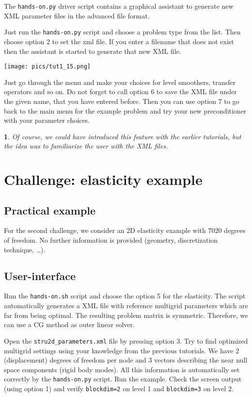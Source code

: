 \documentclass[10pt,fleqn]{book}
\newtheorem*{mycomment}{\ding{42}}
\begin{document}
The \verb|hands-on.py| driver script contains a graphical assistant to generate new XML parameter files in the advanced \muelu file format.

Just run the \verb|hands-on.py| script and choose a problem type from the list. Then choose option 2 to set the xml file. If you enter a filename that does not exist then the assistant is started to generate that new XML file.

\begin{center}\texttt{[image: pics/tut1\_15.png]} \end{center}

Just go through the menu and make your choices for level smoothers, transfer operators and so on. Do not forget to call option 6 to save the XML file under the given name, that you have entered before. Then you can use option 7 to go back to the main menu for the example problem and try your new preconditioner with your parameter choices.

\begin{mycomment}
Of course, we could have introduced this feature with the earlier tutorials, but the idea was to familiarize the user with the XML files.
\end{mycomment}

\chapter{Challenge: elasticity example}
\section{Practical example}

For the second challenge, we consider an 2D elasticity example with $7020$ degrees of freedom. No further information is provided (geometry, discretization technique, \ldots).

\section{User-interface}
Run the \verb|hands-on.sh| script and choose the option 5 for the elasticity. The script automatically generates a XML file with reference multigrid parameters which are far from being optimal. The resulting problem matrix is symmetric. Therefore, we can use a CG method as outer linear solver.

\begin{exercise}
Open the \verb|stru2d_parameters.xml| file by pressing option 3. Try to find optimized multigrid settings using your knowledge from the previous tutorials. We have 2 (displacement) degrees of freedom per node and 3 vectors describing the near null space components (rigid body modes). All this information is automatically set correctly by the \verb|hands-on.py| script.
Run the example. Check the screen output (using option 1) and verify \verb|blockdim=2| on level 1 and \verb|blockdim=3| on level 2.
\end{exercise}
\end{document}
